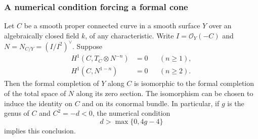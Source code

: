 \subsubsection{A numerical condition forcing a formal cone}

\begin{lemma}
\label{D:negative-curve-linearization}
Let $C$ be a smooth proper connected curve in a smooth surface
$Y$ over an algebraically closed field $k$, of any characteristic.
Write $I=\mathcal O_Y(-C)$ and
$N=N_{C/Y}=(I/I^2)^\vee$.  Suppose
\[
 \begin{aligned}
 H^1(C,T_C\otimes N^{-n})&=0 &&(n\geq1),\\
 H^1(C,N^{1-n})&=0 &&(n\geq2).
 \end{aligned}
 \tag{L}
\]
Then the formal completion of $Y$ along $C$ is isomorphic to the
formal completion of the total space of $N$ along its zero
section.  The isomorphism can be chosen to induce the identity
on $C$ and on its conormal bundle.  In particular, if $g$ is
the genus of $C$ and $C^2=-d<0$, the numerical condition
\[
                   d>\max\{0,4g-4\}
 \tag{N}
\]
implies this conclusion.
\end{lemma}

